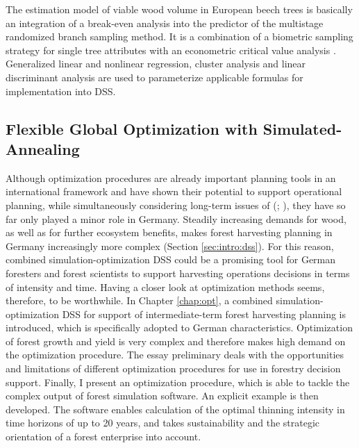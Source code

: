 The estimation model of viable wood volume in European beech trees is basically an integration of a break-even analysis into the predictor of the multistage randomized branch sampling method. It is a combination of a biometric sampling strategy for single tree attributes \citep[p. 405]{Gregoire_2008} with an econometric critical value analysis \citep[p. 46]{mushoff_2013}. Generalized linear and nonlinear regression, cluster analysis and linear discriminant analysis are used to parameterize applicable formulas for implementation into DSS.

\subsection{Flexible Global Optimization with Simulated-Annealing}
\label{subsec:intro:struct:opt}
Although optimization procedures are already important planning tools in an international framework \citep[p. 1]{hoganson_2015} and have shown their potential to support operational planning, while simultaneously considering long-term issues of (\citealp[p. 1]{hoganson_2015}; \citealp[p. 1081]{pretzsch_2008}), they have so far only played a minor role in Germany. Steadily increasing demands for wood, as well as for further ecosystem benefits, makes forest harvesting planning in Germany increasingly more complex (Section \ref{sec:intro:dss}). For this reason, combined si\-mu\-la\-tion-op\-ti\-mi\-za\-tion DSS could be a promising tool for German foresters and forest scientists to support harvesting operations decisions in terms of intensity and time. Having a closer look at optimization methods seems, therefore, to be worthwhile. In Chapter \ref{chap:opt}, a combined si\-mu\-la\-tion-op\-ti\-mi\-za\-tion DSS for support of intermediate-term forest harvesting planning is introduced, which is specifically adopted to German characteristics. Optimization of forest growth and yield is very complex and therefore makes high demand on the optimization procedure. The essay preliminary deals with the opportunities and limitations of different optimization procedures for use in forestry decision support. Finally, I present an optimization procedure, which is able to tackle the complex output of forest simulation software. An explicit example is then developed. The software enables calculation of the optimal thinning intensity in time horizons of up to 20 years, and takes sustainability and the strategic orientation of a forest enterprise into account.

